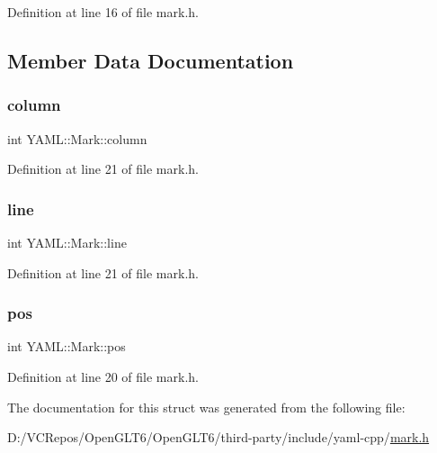 Definition at line 16 of file mark.\+h.



\subsection{Member Data Documentation}
\mbox{\label{struct_y_a_m_l_1_1_mark_a1e3db10ef37e390ea51bc3540ac560d0}} 
\subsubsection{\texorpdfstring{column}{column}}
{\footnotesize\ttfamily int Y\+A\+M\+L\+::\+Mark\+::column}



Definition at line 21 of file mark.\+h.

\mbox{\label{struct_y_a_m_l_1_1_mark_a30f6ac28c5002a88f1109ce64ca7f4ec}} 
\subsubsection{\texorpdfstring{line}{line}}
{\footnotesize\ttfamily int Y\+A\+M\+L\+::\+Mark\+::line}



Definition at line 21 of file mark.\+h.

\mbox{\label{struct_y_a_m_l_1_1_mark_ae77fbebfc1c81a3e431a0674759092c2}} 
\subsubsection{\texorpdfstring{pos}{pos}}
{\footnotesize\ttfamily int Y\+A\+M\+L\+::\+Mark\+::pos}



Definition at line 20 of file mark.\+h.



The documentation for this struct was generated from the following file\+:\begin{DoxyCompactItemize}
\item 
D\+:/\+V\+C\+Repos/\+Open\+G\+L\+T6/\+Open\+G\+L\+T6/third-\/party/include/yaml-\/cpp/\mbox{\hyperlink{mark_8h}{mark.\+h}}\end{DoxyCompactItemize}
